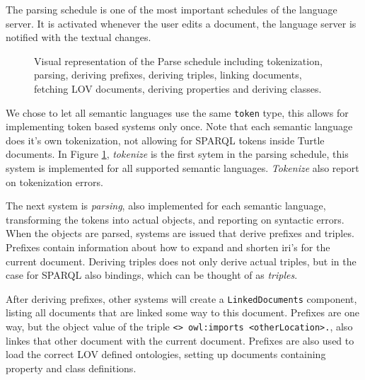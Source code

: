 The parsing schedule is one of the most important schedules of the language server.
It is activated whenever the user edits a document, the language server is notified with the textual changes.


\begin{figure}[tb]
 \centering
  \caption{Visual representation of the Parse schedule including tokenization, parsing, deriving prefixes, deriving triples, linking documents, fetching LOV documents, deriving properties and deriving classes. }\label{fig:Parse}
\end{figure}

We chose to let all semantic languages use the same \texttt{token} type, this allows for implementing token based systems only once.
Note that each semantic language does it's own tokenization, not allowing for SPARQL tokens inside Turtle documents.
In Figure \ref{fig:Parse}, \textit{tokenize} is the first sytem in the parsing schedule, this system is implemented for all supported semantic languages. \textit{Tokenize} also report on tokenization errors.

The next system is \textit{parsing}, also implemented for each semantic language, transforming the tokens into actual objects, and reporting on syntactic errors. 
When the objects are parsed, systems are issued that derive prefixes and triples. 
Prefixes contain information about how to expand and shorten iri's for the current document.
Deriving triples does not only derive actual triples, but in the case for SPARQL also bindings, which can be thought of as \textit{triples}.

After deriving prefixes, other systems will create a \texttt{LinkedDocuments} component, listing all documents that are linked some way to this document.
Prefixes are one way, but the object value of the triple \texttt{<> owl:imports <otherLocation>.}, also linkes that other document with the current document.
Prefixes are also used to load the correct LOV defined ontologies, setting up documents containing property and class definitions.

